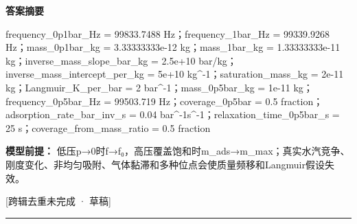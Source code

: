 \documentclass[UTF8,11pt,a4paper]{ctexart}
\begin{document}
\noindent\textbf{答案摘要}\par
frequency\_0p1bar\_Hz = 99833.7488 Hz；frequency\_1bar\_Hz = 99339.9268 Hz；mass\_0p1bar\_kg = 3.33333333e-12 kg；mass\_1bar\_kg = 1.33333333e-11 kg；inverse\_mass\_slope\_bar\_kg = 2.5e+10 bar/kg；inverse\_mass\_intercept\_per\_kg = 5e+10 kg\textasciicircum{}-1；saturation\_mass\_kg = 2e-11 kg；Langmuir\_K\_per\_bar = 2 bar\textasciicircum{}-1；mass\_0p5bar\_kg = 1e-11 kg；frequency\_0p5bar\_Hz = 99503.719 Hz；coverage\_0p5bar = 0.5 fraction；adsorption\_rate\_bar\_inv\_s = 0.04 bar\textasciicircum{}-1s\textasciicircum{}-1；relaxation\_time\_0p5bar\_s = 25 s；coverage\_from\_mass\_ratio = 0.5 fraction\par
\noindent\textbf{模型前提：}
低压p→0时f→f₀，高压覆盖饱和时m\_ads→m\_max；真实水汽竞争、刚度变化、非均匀吸附、气体黏滞和多种位点会使质量频移和Langmuir假设失效。\par
\noindent\textcolor{red!65!black}{[跨辑去重未完成 · 草稿]} \par
\medskip\hrule\medskip
{}
\end{document}
